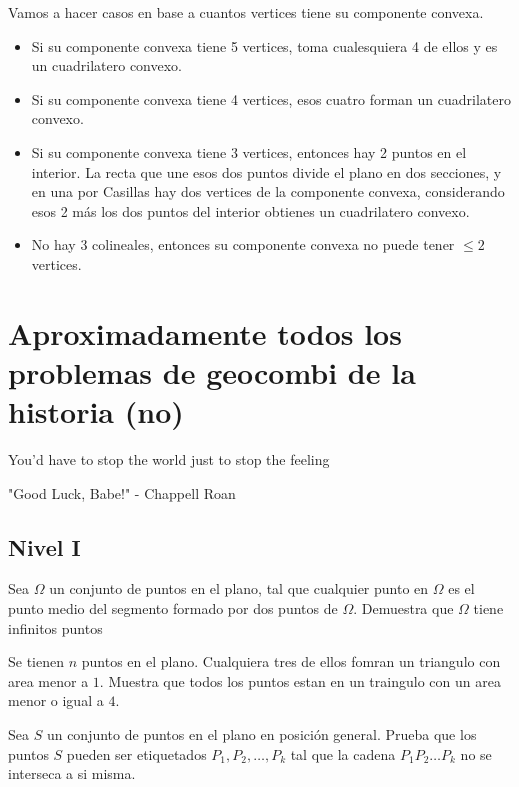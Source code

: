 \documentclass[11pt]{scrartcl}
\begin{document}
\begin{soln}
Vamos a hacer casos en base a cuantos vertices tiene su componente convexa. 
\begin{itemize}
    \item Si su componente convexa tiene 5 vertices, toma cualesquiera 4 de ellos y es un cuadrilatero convexo. 
    \item Si su componente convexa tiene 4 vertices, esos cuatro forman un cuadrilatero convexo.
    \item Si su componente convexa tiene 3 vertices, entonces hay 2 puntos en el interior. La recta que une esos dos puntos divide el plano en dos secciones, y en una por Casillas hay dos vertices de la componente convexa, considerando esos 2 más los dos puntos del interior obtienes un cuadrilatero convexo.
    \item No hay 3 colineales, entonces su componente convexa no puede tener $\leq 2$ vertices.
\end{itemize}
\end{soln}
\newpage
\section{Aproximadamente todos los problemas de geocombi de la historia (no)}
\epigraph{You'd have to stop the world just to stop the feeling}{"Good Luck, Babe!" - Chappell Roan }

\subsection{Nivel I}
\begin{problem}
 Sea $\Omega$ un conjunto de puntos en el plano, tal que cualquier punto en $\Omega$ es el punto medio del segmento formado por dos puntos de $\Omega$. Demuestra que $\Omega$ tiene infinitos puntos
\end{problem}

\begin{problem}
    Se tienen $n$ puntos en el plano. Cualquiera tres de ellos fomran un triangulo con area menor a $1$. Muestra que todos los puntos estan en un traingulo con un area menor o igual a $4$.
\end{problem}

\begin{problem}
Sea $S$ un conjunto de puntos en el plano en posición general. Prueba que los puntos $S$ pueden ser etiquetados $P_1,P_2, \ldots, P_k$ tal que la cadena $P_1P_2\ldots P_k$ no se interseca a si misma.
\end{problem}
\end{document}
